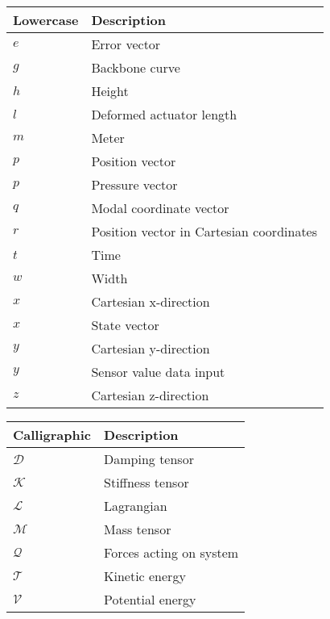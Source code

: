 \begin{spacing}{0.9}
\begin{multicols}{2}
\begin{table}[H]
\centering
    \begin{tabular}{p{1.7cm} p{4.8cm}} \hline
    \textbf{Lowercase}    &   \textbf{Description }\\ \hline
     $e$     & Error vector \\
     $g$     & Backbone curve \\
     $h$     & Height \\
     $l$     & Deformed actuator length \\
     $m$     & Meter \\
     $p$     & Position vector \\
     $p$     & Pressure vector \\
     $q$     & Modal coordinate vector \\
     $r$     & Position vector in Cartesian coordinates \\
     $t$     & Time \\
     $w$     & Width \\
     $x$     & Cartesian x-direction \\
     $x$     & State vector \\
     $y$     & Cartesian y-direction \\
     $y$     & Sensor value data input \\
     $z$     & Cartesian z-direction \\ \hline
    \end{tabular}
\end{table}



\begin{table}[H]
\centering
    \begin{tabular}{p{2.5cm} p{4cm}} \hline
    \textbf{Calligraphic}    &   \textbf{Description }\\ \hline

    $\mathcal{D}$     &  Damping tensor \\
    $\mathcal{K}$     &  Stiffness tensor \\
    $\mathcal{L}$     &  Lagrangian \\
    $\mathcal{M}$     &  Mass tensor \\
    $\mathcal{Q}$     &  Forces acting on system \\
    $\mathcal{T}$     &  Kinetic energy \\
    $\mathcal{V}$     &  Potential energy \\ \hline
    \end{tabular}
\end{table}




\end{multicols}
\end{spacing}
